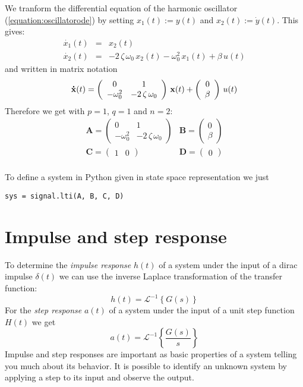 \documentclass[a4paper,12pt]{article}
\renewcommand{\Vec}[1]{{\bf #1}}
\newcommand{\Mat}[1]{\mathbf{#1}}
\newcommand{\Section}[2]{\section{#2}\label{section:#1}}
\newcommand{\ERef}[1]{(\ref{equation:#1})}
\begin{document}
We tranform the differential equation of the harmonic oscillator
\ERef{oscillatorode} by setting $x_1(t):=y(t)$ and $x_2(t):=\dot{y}(t)$.
This gives:
\begin{eqnarray}
	\dot{x_1}(t)&=&x_2(t)\\
	\dot{x_2}(t)&=&-2\,\zeta\,\omega_0\,x_2(t)-\omega_0^2\,x_1(t)+\beta\,u(t)
\end{eqnarray}
and written in matrix notation
\begin{equation}
\Vec{\dot{x}}(t)=\left(\begin{array}{cc}0 & 1\\-\omega_0^2 & -2\,\zeta\,\omega_0\end{array}\right)\,\Vec{x}(t)+\left(\begin{array}{c}0\\\beta\end{array}\right)\,u(t)
\end{equation}
Therefore we get with $p=1$, $q=1$ and $n=2$:
\begin{equation}
\begin{array}{ll}
	\Mat{A}=\left(\begin{array}{cc}
		0 & 1\\
		-\omega_0^2 & -2\,\zeta\,\omega_0
	\end{array}\right) &
	\Mat{B}=\left(\begin{array}{c}
		0\\
		\beta
	\end{array}\right)\\[4ex]
	\Mat{C}=\left(\begin{array}{cc}
		1 & 0
	\end{array}\right) &
	\Mat{D}=\left(\begin{array}{c}
		0
	\end{array}\right)\\
\end{array}
\end{equation}

To define a system in Python given in state space representation we just
\begin{verbatim}
sys = signal.lti(A, B, C, D)
\end{verbatim}

\Section{pulsestep}{Impulse and step response}

To determine the {\em impulse response} $h(t)$ of a system under the input of a
dirac impulse $\delta(t)$ we can use the inverse Laplace transformation of the
transfer function:
\begin{equation}
h(t)=\mathcal{L}^{-1}\left\{G(s)\right\}
\end{equation}
For the {\em step response} $a(t)$ of a system under the input of a unit step
function $H(t)$ we get
\begin{equation}
a(t)=\mathcal{L}^{-1}\left\{\frac{G(s)}{s}\right\}
\end{equation}
Impulse and step responses are important as basic properties of a system
telling you much about its behavior. It is possible to identify an unknown
system by applying a step to its input and observe the output.\\
\end{document}
